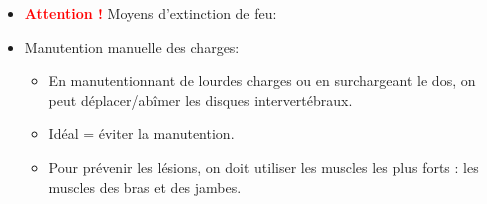 \documentclass[a4paper]{article}
\begin{document}
\begin{itemize}
\item \textcolor{red}{\textbf{Attention !}} Moyens d'extinction de feu:
\begin{center}
\end{center}





\item Manutention manuelle des charges:
\begin{itemize}
    \item En manutentionnant de lourdes charges ou en surchargeant le dos, on peut déplacer/abîmer les disques intervertébraux.
    \item Idéal = éviter la manutention.
    \item Pour prévenir les lésions, on doit utiliser les muscles les plus forts : les muscles des bras et des jambes.
\end{itemize}






\end{itemize}
\end{document}
